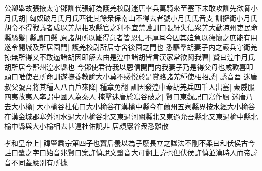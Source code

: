 公卿舉故張掖太守鄧訓代張紆為護羌校尉迷唐率兵萬騎來至塞下未敢攻訓先欲脅小月氏胡|{
	匈奴破月氏月氏西徙其餘衆保南山不得去者號小月氏氏音支}
訓擁衛小月氏胡令不得戰議者咸以羌胡相攻縣官之利不宜禁護訓曰張紆失信衆羌大動凉州吏民命縣絲髪|{
	縣讀曰懸}
原諸胡所以難得意者皆恩信不厚耳今因其廹急以德懷之庶能有用遂令開城及所居園門|{
	護羌校尉所居寺舍後園之門也}
悉驅羣胡妻子内之嚴兵守衛羌掠無所得又不敢逼諸胡因即解去由是湟中諸胡皆言漢家常欲鬭我曹|{
	賢曰湟中月氏胡所居今鄯州湟水縣也}
今鄧使君待我以恩信開門内我妻子乃是得父母也咸歡喜叩頭曰唯使君所命訓遂撫養教諭大小莫不感悦於是賞賂諸羌種使相招誘|{
	誘音酉}
迷唐叔父號吾將其種人八百戶來降|{
	種章勇翻}
訓因發湟中秦胡羌兵四千人出塞|{
	秦威服四夷故夷人率謂中國人為秦人}
掩擊迷唐於寫谷破之|{
	賢曰東觀記曰寫作鴈}
迷唐乃去大小榆|{
	大小榆谷杜佑曰大小榆谷在漢榆中縣今在蘭州五泉縣界按水經大小榆谷在漢金城郡塞外河水過大小榆谷北又東過河關縣北又東過允吾縣北又東過榆中縣北榆中縣與大小榆相去甚遠杜佑說非}
居頗巖谷衆悉離散

孝和皇帝上|{
	諱肇肅宗第四子也竇后養以為子廢長立之諡法不剛不柔曰和伏侯古今註曰肇之字曰始音兆賢曰案許慎說文肇音大可翻上諱也但伏侯許慎並漢時人而帝諱音不同蓋應别有所據}



